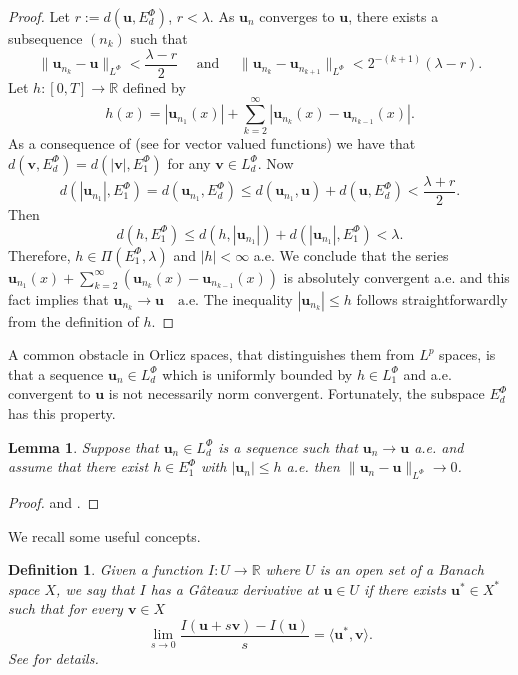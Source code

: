\documentclass[twoside]{article}
\newtheorem{lem}[thm]{Lemma}
\newtheorem{defi}[thm]{Definition}
\theoremstyle{remark}
\newcommand{\orlnor}{\|_{L^{\Phi}}}
\newcommand{\lphi}{L^{\Phi}}
\newcommand{\ephi}{E^{\Phi}}
\renewcommand{\b}[1]{\boldsymbol{#1}}
\renewcommand{\leq}{\leqslant}
\begin{document}
\begin{proof}
Let $r:=d(\b{u},\ephi_d)$, $r<\lambda$. As $\b{u}_n$ converges to $\b{u}$, there exists a subsequence $(n_k)$ such that
\[\|\b{u}_{n_k}-\b{u}\orlnor<\frac{\lambda-r}{2}\quad \text{ and }\quad \|\b{u}_{n_k}-\b{u}_{n_{k+1}}\orlnor<2^{-(k+1)}(\lambda-r).\]
Let $h:[0,T]\rightarrow\mathbb{R}$ defined by
\begin{equation}\label{serie} h(x)=|\b{u}_{n_1}(x)|+\sum_{k=2}^{\infty}|\b{u}_{n_k}(x)-\b{u}_{n_{k-1}}(x)|.
\end{equation}
As a consequence  of \cite[Lemma 10.1]{KR} (see \cite[Thm. 5.5]{Orliczvectorial2005} for vector valued functions)  we have that $d(\b{v},\ephi_d)=d(|\b{v}|,\ephi_1)$ for any $\b{v}\in\lphi_d$. 
Now
\[d(|\b{u}_{n_1}|,\ephi_1)= d(\b{u}_{n_1},\ephi_d)\leq d(\b{u}_{n_1},\b{u})+d(\b{u},\ephi_d)<\frac{\lambda+r}{2}.\]
Then
\[d(h,\ephi_1)\leq d(h,|\b{u}_{n_1}|)+d(|\b{u}_{n_1}|,\ephi_1)< \lambda.\]
Therefore, $h\in\Pi(\ephi_1,\lambda)$ and  $|h|<\infty$ a.e. 
We conclude that the series  $\b{u}_{n_1}(x)+\sum_{k=2}^{\infty}(\b{u}_{n_k}(x)-\b{u}_{n_{k-1}}(x))$
is absolutely convergent a.e. and this fact implies that $\b{u}_{n_k}\rightarrow \b{u} \quad\text{a.e.}$ 
The inequality $|\b{u}_{n_k}|\leq h$ follows straightforwardly from the definition of $h$.
\end{proof}

A common obstacle in Orlicz spaces, that distinguishes them from $L^p$ spaces, is that a  sequence $\b{u}_n\in\lphi_d$ which is  uniformly bounded by $ h\in\lphi_1$ and a.e. convergent to $\b{u}$ is not necessarily norm convergent.
Fortunately, the subspace $\ephi_d$ has this property. 

\begin{lem}\label{lema_conv_may}
Suppose that $\b{u}_n \in\lphi_d$ is a sequence such that $\b{u}_n\to \b{u}$ a.e. and assume that there exist $h\in\ephi_1$ with $|\b{u}_n|\leq h$ a.e. 
then $\|\b{u}_n-\b{u}\orlnor\to 0$.
\end{lem}
\begin{proof}\cite[p. 84]{rao1991theory} and \cite[Thm. 10.3]{KR}.
\end{proof}


  We recall some useful concepts.

	\begin{defi} 
	Given a function $I:U\to\mathbb{R}$ where $U$ is an open set of a Banach space $X$,
we say that $I$ has a G\^ateaux derivative at $\b{u} \in U$ if there exists $\b{u}^*\in X^*$ such that for every $\b{v} \in X$
\[
\lim_{s \rightarrow 0}\frac{I(\b{u}+s\b{v})-I(\b{u}) }{s}=\langle \b{u}^* , \b{v}\rangle.
\]
See \cite{ambrosetti} for details. 
\end{defi}
\end{document}
